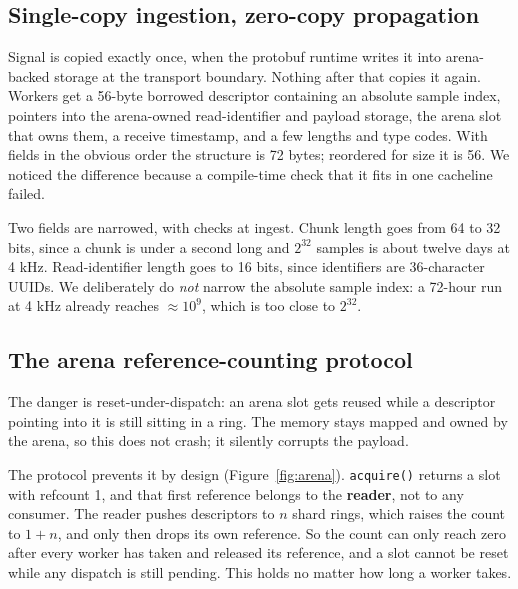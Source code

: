 \documentclass[conference]{IEEEtran}
\begin{document}
\subsection{Single-copy ingestion, zero-copy propagation}

Signal is copied exactly once, when the protobuf runtime writes it into arena-backed storage at
the transport boundary. Nothing after that copies it again. Workers get a 56-byte borrowed
descriptor containing an absolute sample index, pointers into the arena-owned read-identifier
and payload storage, the arena slot that owns them, a receive timestamp, and a few lengths and
type codes. With fields in the obvious order the structure is 72 bytes; reordered for size it is
56. We noticed the difference because a compile-time check that it fits in one cacheline failed.

Two fields are narrowed, with checks at ingest. Chunk length goes from 64 to 32 bits, since a
chunk is under a second long and $2^{32}$ samples is about twelve days at 4 kHz. Read-identifier
length goes to 16 bits, since identifiers are 36-character UUIDs. We deliberately do \emph{not}
narrow the absolute sample index: a 72-hour run at 4 kHz already reaches ${\approx}10^9$, which
is too close to $2^{32}$.

\subsection{The arena reference-counting protocol}

The danger is reset-under-dispatch: an arena slot gets reused while a descriptor pointing into
it is still sitting in a ring. The memory stays mapped and owned by the arena, so this does not
crash; it silently corrupts the payload.

The protocol prevents it by design (Figure~\ref{fig:arena}). \texttt{acquire()} returns a slot
with refcount 1, and that first reference belongs to the \textbf{reader}, not to any consumer.
The reader pushes descriptors to $n$ shard rings, which raises the count to $1 + n$, and only
then drops its own reference. So the count can only reach zero after every worker has taken and
released its reference, and a slot cannot be reset while any dispatch is still pending. This
holds no matter how long a worker takes.
\end{document}

